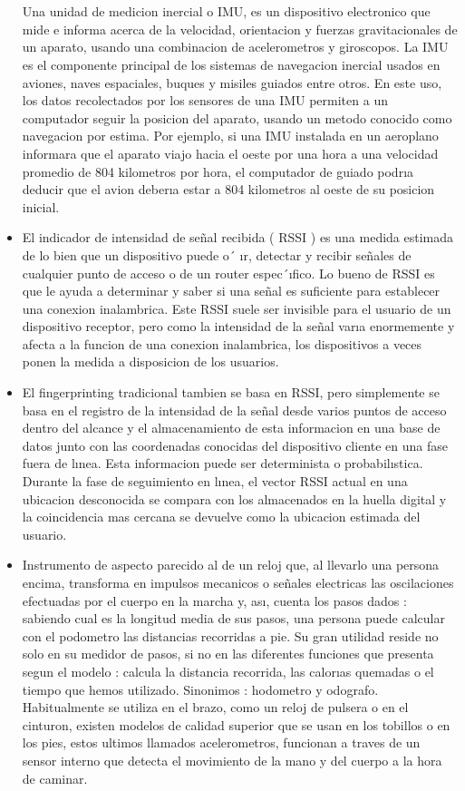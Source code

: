 \documentclass[conference,compsoc,onecolumn]{IEEEtran}
\begin{document}
\begin{itemize}
     \\ \\Una  unidad  de  medicion  inercial  o  IMU,  es  un  dispositivo  electronico  que  mide  e  informa  acerca  de  la velocidad, orientacion y fuerzas gravitacionales de un aparato, usando una combinacion de acelerometros y giroscopos. La IMU es el componente principal de los sistemas de navegacion inercial usados en aviones, naves espaciales, buques y misiles guiados entre otros. En este uso, los datos recolectados por los sensores de  una  IMU  permiten  a  un  computador  seguir  la  posicion  del  aparato,  usando  un  metodo  conocido  como navegacion por estima. Por ejemplo, si una IMU instalada en un aeroplano informara que el aparato viajo hacia el oeste por una hora a una velocidad promedio de 804 kilometros por hora, el computador de guiado podrıa deducir que el avion deberıa estar a 804 kilometros al oeste de su posicion inicial. 
    \item El indicador de intensidad de señal recibida ( RSSI ) es una medida estimada de lo bien que un dispositivo puede o´ ır, detectar y recibir señales de cualquier punto de acceso o de un router espec´ıfico. Lo bueno de RSSI es  que  le  ayuda  a  determinar  y  saber  si  una  señal  es  suficiente  para  establecer  una  conexion  inalambrica. Este RSSI suele ser invisible para el usuario de un dispositivo receptor, pero como la intensidad de la señal varıa  enormemente  y  afecta  a  la  funcion  de  una  conexion  inalambrica,  los  dispositivos  a  veces  ponen  la medida a disposicion de los usuarios. 
    \item El fingerprinting tradicional tambien se basa en RSSI, pero simplemente se basa en el registro de la intensidad de  la  señal  desde  varios  puntos  de  acceso  dentro  del  alcance  y  el  almacenamiento  de  esta  informacion  en una base de datos junto con las coordenadas conocidas del dispositivo cliente en una fase fuera de lınea. Esta informacion puede ser determinista o probabilıstica. Durante la fase de seguimiento en lınea, el vector RSSI actual en una ubicacion desconocida se compara con los almacenados en la huella digital y la coincidencia mas cercana se devuelve como la ubicacion estimada del usuario. 
    \item Instrumento de aspecto parecido al de un reloj que, al llevarlo una persona encima, transforma en impulsos mecanicos o señales electricas las oscilaciones efectuadas por el cuerpo en la marcha y, ası, cuenta los pasos dados : sabiendo cual es la longitud media de sus pasos, una persona puede calcular con el podometro las distancias recorridas a pie. Su gran utilidad reside no solo en su medidor de pasos, si no en las diferentes funciones que presenta segun el modelo : calcula la distancia recorrida, las calorıas quemadas o el tiempo que hemos utilizado. Sinonimos : hodometro y odografo. Habitualmente se utiliza en el brazo, como un reloj de pulsera o en el cinturon, existen modelos de calidad superior que se usan en los tobillos o en los pies, estos  ultimos  llamados  acelerometros,  funcionan  a  traves  de  un  sensor  interno  que  detecta  el  movimiento de la mano y del cuerpo a la hora de caminar. 

\end{itemize}
\end{document}
